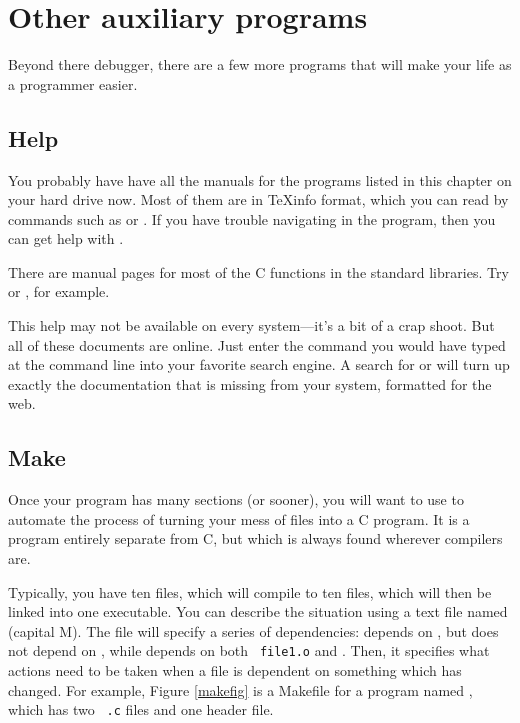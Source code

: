 

\section{\treesymbol Other auxiliary programs} 
Beyond there debugger, there
are a few more programs that will make your life as a programmer easier.

\subsection{Help} 
You probably have have all the manuals for the programs listed in this
chapter on your hard drive now. Most of them are in \TeX info format,
which you can read by commands such as  or . If
you have trouble navigating in the  program, then you can
get help with .

There are manual pages for most of the C functions in the standard
libraries. Try  or , for example.

This help may not be available on every system---it's a bit of
a crap shoot. But all of these documents are online. Just enter the
command you would have typed at the command line into your favorite
search engine. A search for  or  will
turn up exactly the documentation that is missing from your system,
formatted for the web.

\subsection{Make} \label{make} 
Once your program has many sections (or sooner), you will want to use
 to automate the process of turning your mess of files into
a C program.  It is a program entirely separate from C, but which
is always found wherever compilers are.

Typically, you have ten  files, which will compile
to ten  files, which will then be linked into one executable.
You can describe the situation using a
text file named  (capital M). The file will specify a
series of dependencies:  depends on , but does
not depend on , while  depends on both {\tt
file1.o} and .  Then, it specifies what actions need to be taken
when a file is dependent on something which has changed.  For example,
Figure \ref{makefig} is a Makefile for a program named , which has two {\tt
.c} files and one header file.

